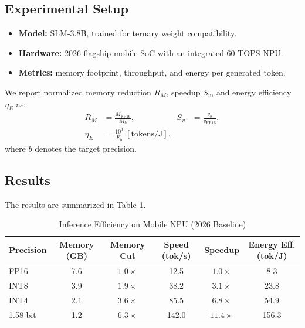 \documentclass[twocolumn,10pt]{article}
\begin{document}
\subsection{Experimental Setup}
\begin{itemize}
    \item \textbf{Model:} SLM-3.8B, trained for ternary weight compatibility.
    \item \textbf{Hardware:} 2026 flagship mobile SoC with an integrated 60 TOPS NPU.
    \item \textbf{Metrics:} memory footprint, throughput, and energy per generated token.
\end{itemize}
We report normalized memory reduction $R_M$, speedup $S_v$, and energy efficiency $\eta_E$ as:
\begin{equation}
\begin{aligned}
R_M&=\frac{M_{\mathrm{FP16}}}{M_b},
&
S_v&=\frac{v_b}{v_{\mathrm{FP16}}},\\
\eta_E&=\frac{10^3}{E_b}\ [\mathrm{tokens/J}].
\end{aligned}
\label{eq:efficiency_metrics}
\end{equation}
where $b$ denotes the target precision.

\subsection{Results}
The results are summarized in Table \ref{tab:results}.

\begin{table}[t]
\centering
\caption{Inference Efficiency on Mobile NPU (2026 Baseline)}
\label{tab:results}
\begin{tabular}{lccccc}
\toprule
\textbf{Precision} & \textbf{Memory (GB)} & \textbf{Memory Cut} & \textbf{Speed (tok/s)} & \textbf{Speedup} & \textbf{Energy Eff. (tok/J)} \\
\midrule
FP16 & 7.6 & $1.0\times$ & 12.5 & $1.0\times$ & 8.3 \\
INT8 & 3.9 & $1.9\times$ & 38.2 & $3.1\times$ & 23.8 \\
INT4 & 2.1 & $3.6\times$ & 85.5 & $6.8\times$ & 54.9 \\
\rowcolor{EdgeGreen!10}
1.58-bit & 1.2 & $6.3\times$ & 142.0 & $11.4\times$ & 156.3 \\
\bottomrule
\end{tabular}
\end{table}
\end{document}
